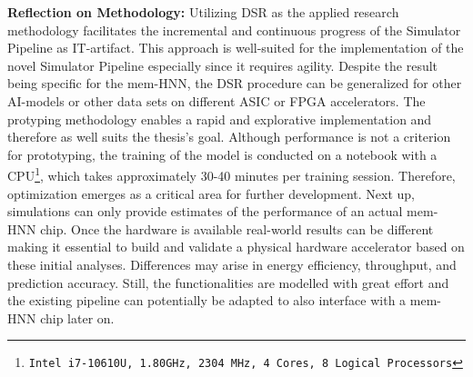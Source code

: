 \textbf{Reflection on Methodology:} 
Utilizing \ac{DSR} as the applied research methodology facilitates the incremental and continuous progress of the Simulator Pipeline as \ac{IT}-artifact.
This approach is well-suited for the implementation of the novel Simulator Pipeline especially since it requires agility.
Despite the result being specific for the \ac{mem-HNN}, the \ac{DSR} procedure can be generalized for other AI-models or other data sets on different \ac{ASIC} or \ac{FPGA} accelerators. 
The protyping methodology enables a rapid and explorative implementation and therefore as well suits the thesis's goal. 
Although performance is not a criterion for prototyping, the training of the model is conducted on a notebook with a CPU\footnote{\texttt{Intel i7-10610U, 1.80GHz, 2304 MHz, 4 Cores, 8 Logical Processors}}, which takes approximately 30-40 minutes per training session.
Therefore, optimization emerges as a critical area for further development.
Next up, simulations can only provide estimates of the performance of an actual \ac{mem-HNN} chip.
Once the hardware is available real-world results can be different making it essential to build and validate a physical hardware accelerator based on these initial analyses.
Differences may arise in energy efficiency, throughput, and prediction accuracy.
Still, the functionalities are modelled with great effort and the existing pipeline can potentially be adapted to also interface with a \ac{mem-HNN} chip later on.


